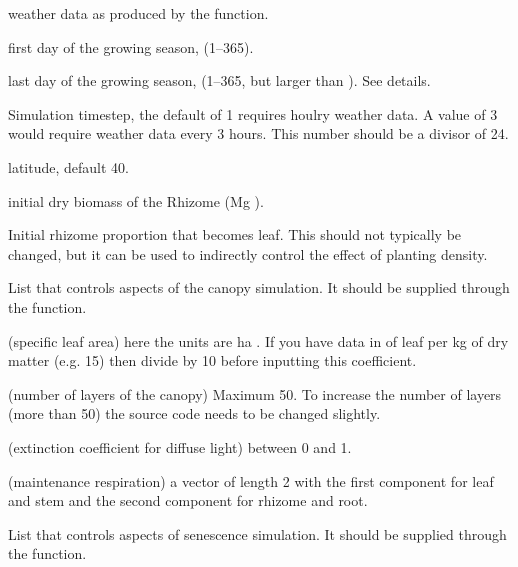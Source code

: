 \documentclass[letterpaper]{book}
\begin{document}
\begin{Arguments}
\begin{ldescription}
\item[\code{WetDat}] weather data as produced by the
 function.

\item[\code{day1}] first day of the growing season, (1--365).

\item[\code{dayn}] last day of the growing season, (1--365, but
larger than ). See details.

\item[\code{timestep}] Simulation timestep, the default of 1
requires houlry weather data. A value of 3 would require
weather data every 3 hours.  This number should be a
divisor of 24.

\item[\code{lat}] latitude, default 40.

\item[\code{iRhizome}] initial dry biomass of the Rhizome (Mg
).

\item[\code{irtl}] Initial rhizome proportion that becomes leaf.
This should not typically be changed, but it can be used
to indirectly control the effect of planting density.

\item[\code{canopyControl}] List that controls aspects of the
canopy simulation. It should be supplied through the
 function.

 (specific leaf area) here the units are ha
.  If you have data in  of leaf per
kg of dry matter (e.g. 15) then divide by 10 before
inputting this coefficient.

 (number of layers of the canopy) Maximum
50. To increase the number of layers (more than 50) the
 source code needs to be changed slightly.

 (extinction coefficient for diffuse light)
between 0 and 1.

 (maintenance respiration) a vector of length
2 with the first component for leaf and stem and the
second component for rhizome and root.

\item[\code{seneControl}] List that controls aspects of
senescence simulation. It should be supplied through the
 function.


\end{ldescription}
\end{Arguments}
\end{document}
